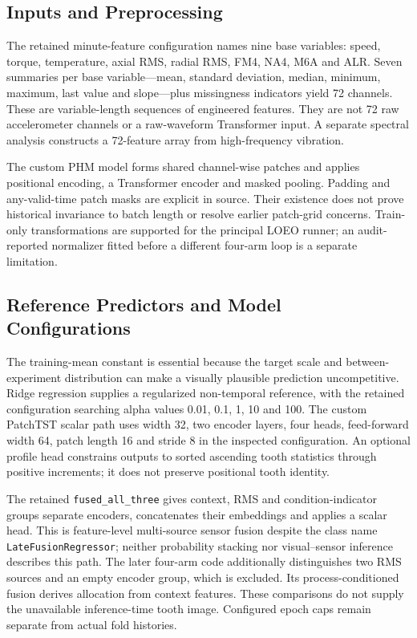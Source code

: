 \subsection{Inputs and Preprocessing}
The retained minute-feature configuration names nine base variables: speed, torque, temperature, axial RMS, radial RMS, FM4, NA4, M6A and ALR. Seven summaries per base variable---mean, standard deviation, median, minimum, maximum, last value and slope---plus missingness indicators yield 72 channels. These are variable-length sequences of engineered features. They are not 72 raw accelerometer channels or a raw-waveform Transformer input. A separate spectral analysis constructs a 72-feature array from high-frequency vibration.

The custom PHM model forms shared channel-wise patches and applies positional encoding, a Transformer encoder and masked pooling. Padding and any-valid-time patch masks are explicit in source. Their existence does not prove historical invariance to batch length or resolve earlier patch-grid concerns. Train-only transformations are supported for the principal LOEO runner; an audit-reported normalizer fitted before a different four-arm loop is a separate limitation.

\subsection{Reference Predictors and Model Configurations}
The training-mean constant is essential because the target scale and between-experiment distribution can make a visually plausible prediction uncompetitive. Ridge regression supplies a regularized non-temporal reference, with the retained configuration searching alpha values 0.01, 0.1, 1, 10 and 100. The custom PatchTST scalar path uses width 32, two encoder layers, four heads, feed-forward width 64, patch length 16 and stride 8 in the inspected configuration. An optional profile head constrains outputs to sorted ascending tooth statistics through positive increments; it does not preserve positional tooth identity.

The retained \texttt{fused\_all\_three} gives context, RMS and condition-indicator groups separate encoders, concatenates their embeddings and applies a scalar head. This is feature-level multi-source sensor fusion despite the class name \texttt{LateFusionRegressor}; neither probability stacking nor visual--sensor inference describes this path. The later four-arm code additionally distinguishes two RMS sources and an empty encoder group, which is excluded. Its process-conditioned fusion derives allocation from context features. These comparisons do not supply the unavailable inference-time tooth image. Configured epoch caps remain separate from actual fold histories.

